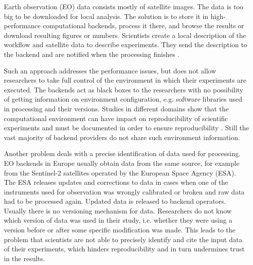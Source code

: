 \documentclass[draft,final]{vutinfth} %
\begin{document}
Earth observation (EO) data consists mostly of satellite images. The data is too big to be downloaded for local analysis. The solution is to store it in high-performance computational backends, process it there, and browse the results or download resulting figures or numbers. Scientists create a local description of the workflow and satellite data to describe experiments. They send the description to the backend and are notified when the processing finishes \cite{geocloud}.  

Such an approach addresses the performance issues, but does not allow researchers to take full control of the environment in which their experiments are executed. The backends act as black boxes to the researchers with no possibility of getting information on environment configuration, e.g. software libraries used in processing and their versions. Studies in different domains show that the computational environment can have impact on reproducibility of scientific experiments and must be documented in order to ensure reproducibility \cite{Freesurfer} \cite{Thestateofreproducibility}  \cite{MiksaBiomedical}. Still the vast majority of backend providers do not share such environment information. 

Another problem deals with a precise identification of data used for processing. EO backends in Europe usually obtain data from the same source, for example from the Sentinel-2 satellites operated by the European Space Agency (ESA). The ESA releases updates and corrections to data in cases when one of the instruments used for observation was wrongly calibrated or broken and raw data had to be processed again. Updated data is released to backend operators. Usually there is no versioning mechanism for data. Researchers do not know which version of data was used in their study, i.e. whether they were using a version before or after some specific modification was made. This leads to the problem that scientists are not able to precisely identify and cite the input data of their experiments, which hinders reproducibility and in turn undermines trust in the  results. 


\end{document}
